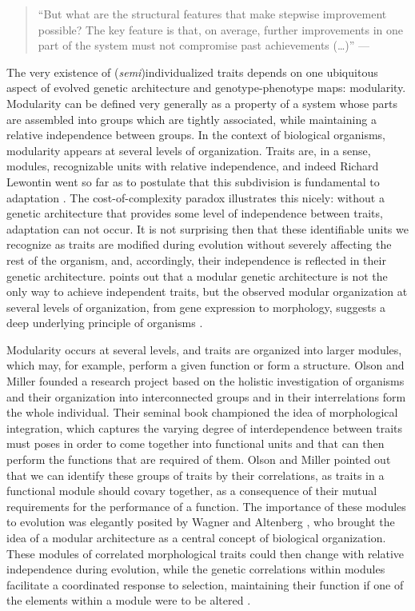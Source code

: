 \begin{refsection}
\begin{quote}
``But what are the structural features that make stepwise improvement
possible? The key feature is that, on average, further improvements in
one part of the system must not compromise past achievements (\ldots{})''
--- \textcite{Wagner1996-ui}
\end{quote}

The very existence of (\emph{semi})individualized traits depends on one
ubiquitous aspect of evolved genetic architecture and genotype-phenotype
maps: modularity. Modularity can
be defined very generally as a property of a system whose parts are
assembled into groups which are tightly associated, while maintaining a
relative independence between groups. In the context of biological
organisms, modularity appears at several levels of organization. Traits
are, in a sense, modules, recognizable units with relative independence,
and indeed Richard Lewontin went so far as to postulate that this
subdivision is fundamental to adaptation \parencite{Lewontin1979-iw}. The
cost-of-complexity paradox illustrates this nicely: without a genetic
architecture that provides some level of independence between traits,
adaptation can not occur. It is not surprising then that these
identifiable units we recognize as traits are modified during evolution
without severely affecting the rest of the organism, and, accordingly,
their independence is reflected in their genetic architecture. 
\textcite{Hansen2003-fh} points out that a modular genetic architecture is
not the only way to achieve independent traits, but the observed modular
organization at several levels of organization, from gene expression to
morphology, suggests a deep underlying principle of organisms
\parencite{Wagner2007-cx}.

Modularity occurs at several levels, and traits are organized into
larger modules, which may, for example, perform a given function or form
a structure. Olson and Miller \parencite*{Olson1958-qk} founded a research
project based on the holistic investigation of organisms and their
organization into interconnected groups and in their interrelations form
the whole individual. Their seminal book championed the idea of
morphological integration, which captures the varying degree of
interdependence between traits must poses in order to come together into
functional units and that can then perform the functions that are
required of them. Olson and Miller pointed out that we can identify
these groups of traits by their correlations, as traits in a functional
module should covary together, as a consequence of their mutual
requirements for the performance of a function. The importance of these
modules to evolution was elegantly posited by Wagner and Altenberg
\parencite*{Wagner1996-ui}, who brought the idea of a modular architecture as
a central concept of biological organization. These modules of
correlated morphological traits could then change with relative
independence during evolution, while the genetic correlations within
modules facilitate a coordinated response to selection, maintaining
their function if one of the elements within a module were to be altered
\parencite{Cheverud1984-mi, Cheverud1982-op}.


\end{refsection}
